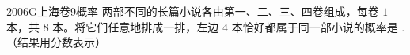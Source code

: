 
\begin{problem}{2006}{G}{上海卷}{9}{概率}
两部不同的长篇小说各由第一、二、三、四卷组成，每卷 $ 1 $ 本，共 $ 8 $ 本。将它们任意地排成一排，左边 $ 4 $ 本恰好都属于同一部小说的概率是 \underline{\hspace{4em}}.（结果用分数表示）
\end{problem}

\begin{answer}

\end{answer}

\begin{solutions}

\end{solutions}